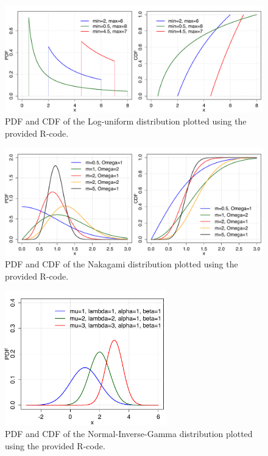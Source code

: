 \begin{figure}[htb!]
\centering
  \includegraphics[width=140mm]{pics/LogUniform_pdf_cdf.pdf}
 \caption{PDF and CDF of the Log-uniform distribution plotted using the provided R-code.}
 \label{fig:LogUniform_pdf_cdf}
\end{figure}

\begin{figure}[htb!]
\centering
  \includegraphics[width=140mm]{pics/Nakagami_pdf_cdf.pdf}
 \caption{PDF and CDF of the Nakagami distribution plotted using the provided R-code.}
 \label{fig:Nakagami_pdf_cdf}
\end{figure}

\begin{figure}[htb!]
\centering
  \includegraphics[width=70mm]{pics/NormalInverseGamma_pdf_cdf.pdf}
 \caption{PDF and CDF of the Normal-Inverse-Gamma distribution plotted using the provided R-code.}
 \label{fig:NormalInverseGamma_pdf_cdf}
\end{figure}

